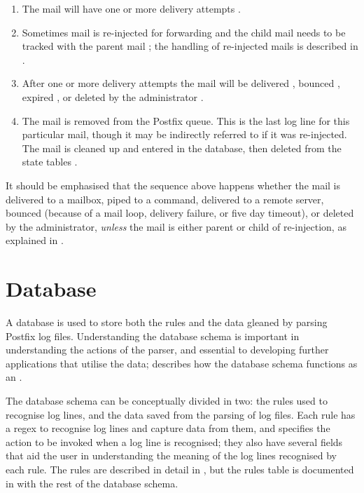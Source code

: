 \begin{enumerate}

    \item The mail will have one or more delivery attempts
        .

    \item Sometimes mail is re-injected for forwarding and the child mail
        needs to be tracked with the parent mail ; the
        handling of re-injected mails is described in .

    \item After one or more delivery attempts the mail will be delivered
        , bounced ,
        expired , or deleted by the administrator
        .

    \item The mail is removed from the Postfix queue.  This is the last log
        line for this particular mail, though it may be indirectly referred
        to if it was re-injected.  The mail is cleaned up and entered in
        the database, then deleted from the state tables
        .

\end{enumerate}

It should be emphasised that the sequence above happens whether the mail is
delivered to a mailbox, piped to a command, delivered to a remote server,
bounced (because of a mail loop, delivery failure, or five day timeout), or
deleted by the administrator, \textit{unless\/} the mail is either parent
or child of re-injection, as explained in .

\section{Database}

\label{database}

A database is used to store both the rules and the data gleaned by parsing
Postfix log files.  Understanding the database schema is important in
understanding the actions of the parser, and essential to developing
further applications that utilise the data; 
describes how the database schema functions as an .

The database schema can be conceptually divided in two: the rules used to
recognise log lines, and the data saved from the parsing of log files.
Each rule has a regex to recognise log lines and capture data from them,
and specifies the action to be invoked when a log line is recognised; they
also have several fields that aid the user in understanding the meaning of
the log lines recognised by each rule.  The rules are described in detail
in , but the rules table is documented
in  with the rest of the database schema.

